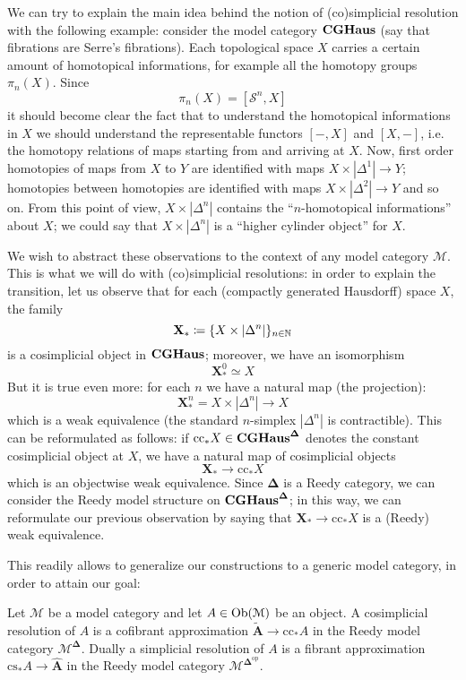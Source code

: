 \begin{refsection}
We can try to explain the main idea behind the notion of (co)simplicial resolution with the following example: consider the model category $\mathbf{CGHaus}$ (say that fibrations are Serre's fibrations). Each topological space $X$ carries a certain amount of homotopical informations, for example all the homotopy groups $\pi_n(X)$. Since
\[
\pi_n(X) = [\mathcal S^n, X]
\]
it should become clear the fact that to understand the homotopical informations in $X$ we should understand the representable functors $[-,X]$ and $[X,-]$, i.e. the homotopy relations of maps starting from and arriving at $X$. Now, first order homotopies of maps from $X$ to $Y$ are identified with maps $X \times |\Delta^1| \to Y$; homotopies between homotopies are identified with maps $X \times |\Delta^2| \to Y$ and so on. From this point of view, $X \times |\Delta^n|$ contains the ``$n$-homotopical informations'' about $X$; we could say that $X \times |\Delta^n|$ is a ``higher cylinder object'' for $X$.

We wish to abstract these observations to the context of any model category $\mathcal M$. This is what we will do with (co)simplicial resolutions: in order to explain the transition, let us observe that for each (compactly generated Hausdorff) space $X$, the family
\[
\mathbf X_*\coloneqq \{X \times |\Delta^n|\}_{n \in \mathbb{N}}
\]
is a cosimplicial object in $\mathbf{CGHaus}$; moreover, we have an isomorphism
\[
\mathbf X_*^0 \simeq X
\]
But it is true even more: for each $n$ we have a natural map (the projection):
\[
\mathbf X_*^n = X \times |\Delta^n| \to X
\]
which is a weak equivalence (the standard $n$-simplex $|\Delta^n|$ is contractible). This can be reformulated as follows: if $\mathrm{cc}_* X \in \mathbf{CGHaus}^{\mathbf \Delta}$ denotes the constant cosimplicial object at $X$, we have a natural map of cosimplicial objects
\[
\mathbf X_* \to \mathrm{cc}_*X
\]
which is an objectwise weak equivalence. Since $\boldsymbol\Delta$ is a Reedy category, we can consider the Reedy model structure on $\mathbf{CGHaus}^{\boldsymbol\Delta}$; in this way, we can reformulate our previous observation by saying that $\mathbf X_* \to \mathrm{cc}_*X$ is a (Reedy) weak equivalence.

This readily allows to generalize our constructions to a generic model category, in order to attain our goal:

\begin{defin}
Let $\mathcal M$ be a model category and let $A \in \operatorname{Ob}(\mathcal M)$ be an object. A cosimplicial resolution of $A$ is a cofibrant approximation $\widetilde{\mathbf A} \to \mathrm{cc}_* A$ in the Reedy model category $\mathcal M^{\boldsymbol\Delta}$. Dually a simplicial resolution of $A$ is a fibrant approximation $\mathrm{cs}_* A \to \widehat{\mathbf A}$ in the Reedy model category $\mathcal M^{\boldsymbol\Delta^{\mathrm{op}}}$.
\end{defin}


\end{refsection}

